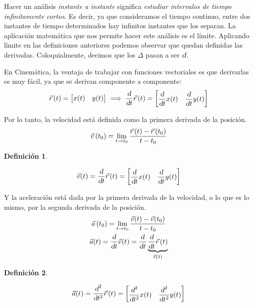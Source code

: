 \documentclass[a5paper,12pt,twoside]{book}
\newtheorem{defn}{{Definición}}[chapter]
\begin{document}
Hacer un análisis \emph{instante a instante} significa \emph{estudiar intervalos de tiempo infinitamente cortos}.
Es decir, ya que consideramos el tiempo continuo, entre dos instantes de tiempo determinados hay infinitos instantes que los separan. La aplicación matemática que nos permite hacer este análisis es el límite. Aplicando límite en las definiciones anteriores podemos observar que quedan definidas las derivadas. Coloquialmente, decimos que los $\Delta$ pasan a ser $\textsl{d}$.

En Cinemática, la ventaja de trabajar con funciones vectoriales es que derivarlas es muy fácil, ya que se derivan componente a componente:
\[
  \vec{r}\hspace{0.05cm} (t) = \begin{bmatrix} x(t) & y(t) \end{bmatrix} \implies
  \dfrac{\textsl{d}}{\textsl{d} t} \vec{r}\hspace{0.05cm} (t) =
  \begin{bmatrix} \dfrac{\textsl{d}}{\textsl{d} t} x(t) & \dfrac{\textsl{d}}{\textsl{d} t} y(t) \end{bmatrix}
\]

Por lo tanto, la velocidad está definida como la primera derivada de la posición.
\begin{equation*}
    \Vec{v}\left(t_0\right) = \lim_{t \to t_0} \dfrac{\vec{r}\hspace{0.05cm}(t)-\vec{r}\hspace{0.05cm}(t_0)}{t-t_0}
\end{equation*}

\begin{mdframed}[style=MyFrame1]
    \begin{defn}
    \end{defn}
    \begin{equation*}
        \Vec{v}(t) = \dfrac{\textsl{d}}{\textsl{d} t} \vec{r}\hspace{0.05cm} (t) = { \begin{bmatrix} \dfrac{\textsl{d}}{\textsl{d} t} x(t) & \dfrac{\textsl{d}}{\textsl{d} t} y(t) \end{bmatrix} }
    \end{equation*}
\end{mdframed}

Y la aceleración está dada por la primera derivada de la velocidad, o lo que es lo mismo, por la segunda derivada de la posición.
\begin{gather*}
    \Vec{a}\left(t_0\right) = \lim_{t \to t_0} \dfrac{\Vec{v}(t)-\Vec{v}(t_0)}{t-t_0}
    \\
    \Vec{a}(t) =
    \dfrac{\textsl{d}}{\textsl{d} t} \Vec{v} (t) =
    \dfrac{\textsl{d}}{\textsl{d} t} \underbrace{\dfrac{\textsl{d}}{\textsl{d} t} \vec{r}\hspace{0.05cm} (t)}_{\Vec{v}(t)}
\end{gather*}

\begin{mdframed}[style=MyFrame1]
    \begin{defn}
    \end{defn}
    \begin{equation*}
        \Vec{a}(t) =
        \dfrac{\textsl{d}^2}{\textsl{d} t^2} \vec{r}\hspace{0.05cm} (t) =
        \begin{bmatrix}
            \dfrac{\textsl{d}^2}{\textsl{d} t^2} x(t) & \dfrac{\textsl{d}^2}{\textsl{d} t^2} y(t)
        \end{bmatrix}
    \end{equation*}
\end{mdframed}
\end{document}
